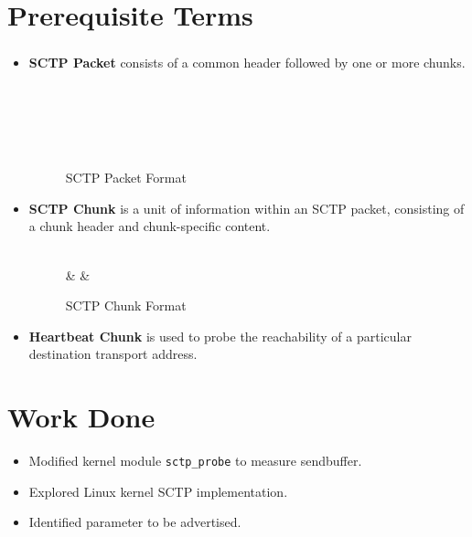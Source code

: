 \documentclass{beamer}
\begin{document}
\section{Prerequisite Terms}
\begin{frame}
\frametitle{\insertsection}
\begin{itemize}

\item \textbf{SCTP Packet} consists of a common header followed by one or
	more chunks.

\begin{figure}
	\centering
	\begin{bytefield}{32}
	\\
	\\
	\\
	\\
	\end{bytefield}
	\caption{SCTP Packet Format \cite{rfc4960}}
\end{figure}
\framebreak
\item \textbf{SCTP Chunk} is a unit of information within an SCTP packet,
consisting of a chunk header and chunk-specific content.

\begin{figure}
	\centering
	\begin{bytefield}{32}
	\\
	 &  & \\
	\end{bytefield}
	\caption{SCTP Chunk Format \cite{rfc4960}}
\end{figure}
\item \textbf{Heartbeat Chunk} is used to probe the
reachability of a particular destination transport address.
\end{itemize}
\end{frame}

\section{Work Done}
\begin{frame}{\insertsection}
\begin{itemize}
\item Modified kernel module \texttt{sctp\_probe} to measure sendbuffer.
\item Explored Linux kernel SCTP implementation.
\item Identified parameter to be advertised.
\end{itemize}
\end{frame}
\end{document}
